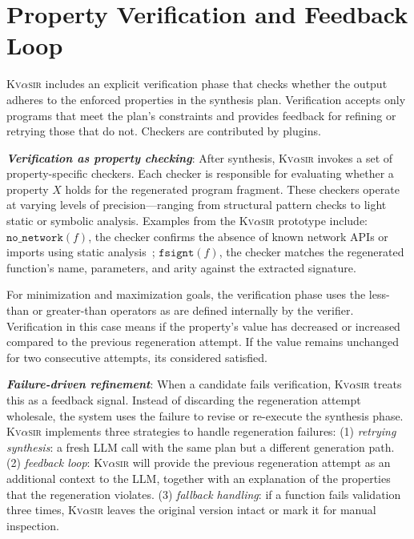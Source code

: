 \documentclass[nonacm,sigplan,review]{acmart}
\newcommand{\sys}{{\scshape Kv{$\alpha$}sir}\xspace}
\newcommand{\heading}[1]{\vspace{2pt}\noindent\textbf{\emph{#1}}:\enspace}
\newcommand{\ttt}[1]{\texttt{#1}\xspace}
\begin{document}
\section{Property Verification and Feedback Loop}
\label{sec:verification}

\sys includes an explicit verification phase that checks whether the output adheres to the enforced properties in the synthesis plan. 
Verification accepts only programs that meet the plan's constraints and
provides feedback for refining or retrying those that do not.
Checkers are contributed by plugins.

\heading{Verification as property checking}
After synthesis, \sys invokes a set of property-specific checkers.
Each checker
is responsible for evaluating whether a property $X$ holds
for the regenerated program fragment.
These checkers operate at varying levels
of precision---ranging from structural pattern checks to light static or
symbolic analysis.
Examples from the \sys prototype include:
  $\ttt{no\_network}(f)$, the checker confirms the absence of known network APIs or imports using static analysis~\cite{mir:ccs:2021};
  $\ttt{fsignt}(f)$, the checker matches the regenerated function's name, parameters, and arity against the extracted signature.

For minimization and maximization goals, the verification phase uses the less-than or greater-than operators as are defined internally by the verifier.
Verification in this case means if the property's value has decreased or increased compared 
to the previous regeneration attempt.
If the value remains unchanged for two consecutive attempts, its considered satisfied.

\heading{Failure-driven refinement}
When a candidate fails verification, \sys treats this as a feedback signal. Instead of discarding the regeneration attempt wholesale, the system uses the failure to revise or re-execute the synthesis phase.
\sys implements three strategies to handle regeneration failures:
  (1) \emph{retrying synthesis}: a fresh LLM call with the same plan but a different generation path.
  (2) \emph{feedback loop}: \sys will provide the previous regeneration attempt 
    as an additional context to the LLM, together with an explanation of the properties that the regeneration violates.
  (3) \emph{fallback handling}: if a function fails validation three times, \sys leaves the original version intact or mark it for manual inspection.

\end{document}
